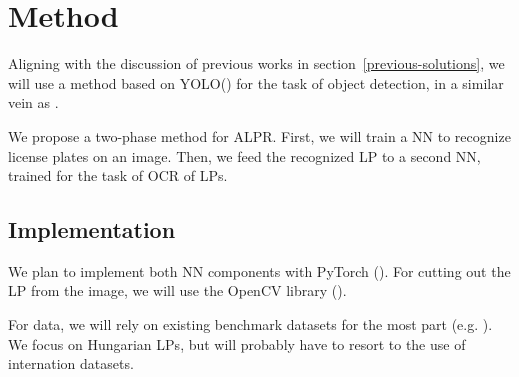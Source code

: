 \section{Method}
\label{method}


Aligning with the discussion of previous works in
section~\ref{previous-solutions}, we will use
a method based on \ac{YOLO}(\cite{redmon2016look}) for the task of object
detection, in a similar vein as \cite{DBLP:journals/corr/abs-1909-01754}. 

We propose a two-phase method for \ac{ALPR}. First, we will train a \ac{NN} to
recognize license plates on an image. Then, we feed the recognized \ac{LP} to
a second \ac{NN}, trained for the task of \ac{OCR} of \ac{LP}s.

\subsection{Implementation}
We plan to implement both \ac{NN} components with PyTorch (\cite{pytorch}).
For cutting out the \ac{LP} from the image, we will use the OpenCV library
(\cite{opencv}).

For data, we will rely on existing benchmark datasets for the most part (e.g.
\cite{DBLP:journals/corr/GoncalvesSMS16}). We focus on Hungarian \ac{LP}s, but
will probably have to resort to the use of internation datasets.


